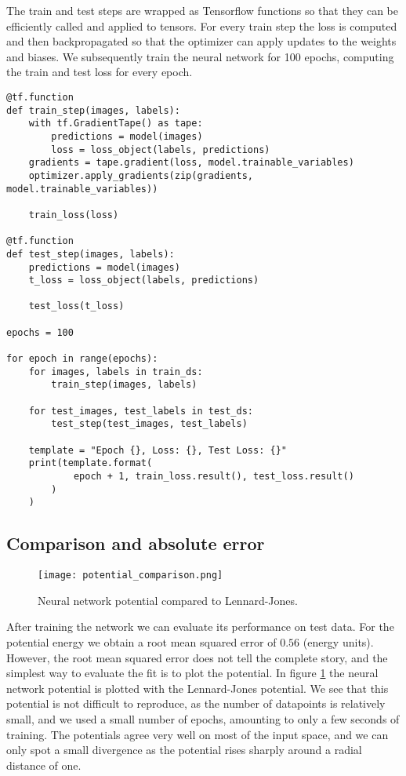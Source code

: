 The train and test steps are wrapped as Tensorflow functions
so that they can be efficiently called and applied to tensors.
For every train step the loss is computed and then backpropagated
so that the optimizer can apply updates to the weights and biases.
We subsequently train the neural network for 100 epochs, computing
the train and test loss for every epoch.

\begin{verbatim}
@tf.function
def train_step(images, labels):
    with tf.GradientTape() as tape:
        predictions = model(images)
        loss = loss_object(labels, predictions)
    gradients = tape.gradient(loss, model.trainable_variables)
    optimizer.apply_gradients(zip(gradients, model.trainable_variables))

    train_loss(loss)

@tf.function
def test_step(images, labels):
    predictions = model(images)
    t_loss = loss_object(labels, predictions)

    test_loss(t_loss)

epochs = 100

for epoch in range(epochs):
    for images, labels in train_ds:
        train_step(images, labels)

    for test_images, test_labels in test_ds:
        test_step(test_images, test_labels)

    template = "Epoch {}, Loss: {}, Test Loss: {}"
    print(template.format(
            epoch + 1, train_loss.result(), test_loss.result()
        )
    )
\end{verbatim}

\subsection{Comparison and absolute error}

\begin{figure}[H]
    \centering
    \texttt{[image: potential\_comparison.png]}
    \caption{Neural network potential compared to Lennard-Jones.}
    \label{fig:potential-comparison}
\end{figure}

After training the network we can evaluate its performance
on test data. 
For the potential energy we obtain a root mean squared error of
$0.56$ (energy units).
However, the root mean squared error does not tell the complete story,
and the simplest way to evaluate the fit is to plot the potential.
In figure \ref{fig:potential-comparison} the neural network potential
is plotted with the Lennard-Jones potential.
We see that this potential is not difficult to reproduce,
as the number of datapoints is relatively small, and we used
a small number of epochs, amounting to only a few seconds of training.
The potentials agree very well on most of the input space, and we can
only spot a small divergence as the potential rises sharply
around a radial distance of one.

